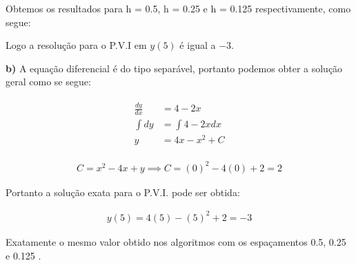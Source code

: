 \documentclass[paper=a4, fontsize=12pt]{scrartcl}
\numberwithin{equation}{section} %
\numberwithin{figure}{section} %
\numberwithin{table}{section} %
\begin{document}
		

		\hspace{2cm}

		

		\hspace{2cm}

		

		Obtemos os resultados para h = 0.5, h = 0.25 e h = 0.125 respectivamente, como segue:
		\hspace{2cm}


		\hspace{2cm}


		\hspace{2cm}


		Logo a resolução para o P.V.I em $ y(5) $ é igual a $-3$.

		\textbf{b)} A equação diferencial é do tipo separável, portanto podemos obter a solução geral como se segue:

		\begin{align*}
		\begin{split}
			\frac{dy}{dx} &= 4 - 2x\\
			\int dy &= \int 4 - 2x dx \\
			y &= 4x - x^2 + C
		\end{split}
		\end{align*}

		\begin{align*}
			C = x^2 - 4x + y \implies C = (0)^2 - 4(0) + 2 = 2
		\end{align*}

		Portanto a solução exata para o P.V.I. pode ser obtida:

		\begin{align*}
			y(5) = 4(5) - (5)^2 + 2 = -3
		\end{align*}

		Exatamente o mesmo valor obtido nos algoritmos com os espaçamentos 0.5, 0.25 e 0.125 .
\end{document}
